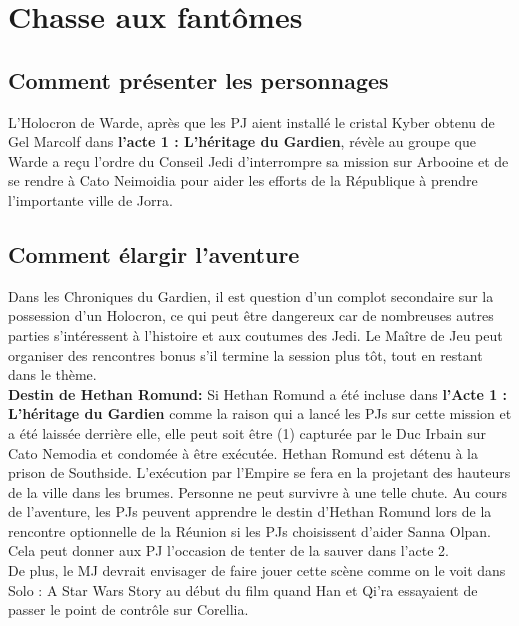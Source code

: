 \documentclass[twoside]{article}
\begin{document}
\section{Chasse aux fantômes}
\subsection{Comment présenter les personnages}

L'Holocron de Warde, après que les PJ aient installé le cristal Kyber obtenu de Gel Marcolf dans \textbf{l'acte 1 : L'héritage du Gardien}, révèle au groupe que Warde a reçu l'ordre du Conseil Jedi d'interrompre sa mission sur Arbooine et de se rendre à Cato Neimoidia pour aider les efforts de la République à prendre l'importante ville de Jorra.\\

\subsection{Comment élargir l'aventure}

Dans les Chroniques du Gardien, il est question d'un complot secondaire sur la possession d'un Holocron, ce qui peut être dangereux car de nombreuses autres parties s'intéressent à l'histoire et aux coutumes des Jedi. Le Maître de Jeu peut organiser des rencontres bonus s'il termine la session plus tôt, tout en restant dans le thème.\\

\textbf{Destin de Hethan Romund:} Si Hethan Romund a été incluse dans \textbf{l'Acte 1 : L'héritage du Gardien} comme la raison qui a lancé les PJs sur cette mission et a été laissée derrière elle, elle peut soit être (1) capturée par le Duc Irbain sur Cato Nemodia et condomée à être exécutée. Hethan Romund est détenu à la prison de Southside. L'exécution par l'Empire se fera en la projetant des hauteurs de la ville dans les brumes.  Personne ne peut survivre à une telle chute. Au cours de l'aventure, les PJs peuvent apprendre le destin d'Hethan Romund lors de la rencontre optionnelle de la Réunion si les PJs choisissent d'aider Sanna Olpan. Cela peut donner aux PJ l'occasion de tenter de la sauver dans l'acte 2. \\

De plus, le MJ devrait envisager de faire jouer cette scène comme on le voit dans Solo : A Star Wars Story au début du film quand Han et Qi'ra essayaient de passer le point de contrôle sur Corellia. \\
\end{document}
